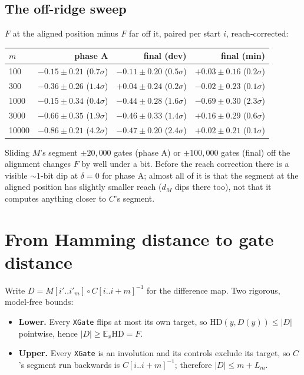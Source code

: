 \documentclass[11pt]{article}
\newcommand{\code}[1]{\texttt{#1}}
\newcommand{\HD}{\mathrm{HD}}
\newcommand{\Ex}{\mathbb{E}_x}
\begin{document}
\subsection{The off-ridge sweep}
$F$ at the aligned position minus $F$ far off it, paired per start $i$, reach-corrected:
\begin{center}\small
\begin{tabular}{@{}lrrr@{}}
\toprule
$m$ & phase A & final (dev) & final (min) \\
\midrule
100    & $-0.15\pm0.21$ ($0.7\sigma$) & $-0.11\pm0.20$ ($0.5\sigma$) & $+0.03\pm0.16$ ($0.2\sigma$) \\
300    & $-0.36\pm0.26$ ($1.4\sigma$) & $+0.04\pm0.24$ ($0.2\sigma$) & $-0.02\pm0.23$ ($0.1\sigma$) \\
1000   & $-0.15\pm0.34$ ($0.4\sigma$) & $-0.44\pm0.28$ ($1.6\sigma$) & $-0.69\pm0.30$ ($2.3\sigma$) \\
3000   & $-0.66\pm0.35$ ($1.9\sigma$) & $-0.46\pm0.33$ ($1.4\sigma$) & $+0.16\pm0.29$ ($0.6\sigma$) \\
10000  & $-0.86\pm0.21$ ($4.2\sigma$) & $-0.47\pm0.20$ ($2.4\sigma$) & $+0.02\pm0.21$ ($0.1\sigma$) \\
\bottomrule
\end{tabular}
\end{center}
Sliding $M$'s segment $\pm20{,}000$ gates (phase A) or $\pm100{,}000$ gates (final) off the alignment
changes $F$ by well under a bit. Before the reach correction there is a visible ${\sim}1$-bit dip at
$\delta=0$ for phase A; almost all of it is that the segment at the aligned position has slightly
smaller reach ($d_M$ dips there too), not that it computes anything closer to $C$'s segment.

\section{From Hamming distance to gate distance}

Write $D = M[i'..i'_m]\circ C[i..i{+}m]^{-1}$ for the difference map. Two rigorous, model-free bounds:

\begin{itemize}
\item \textbf{Lower.} Every \code{XGate} flips at most its own target, so $\HD(y,D(y))\le|D|$ pointwise,
hence $|D| \ge \Ex \HD = F$.
\item \textbf{Upper.} Every \code{XGate} is an involution and its controls exclude its target, so $C$'s
segment run backwards is $C[i..i{+}m]^{-1}$; therefore $|D| \le m + L_m$.
\end{itemize}
\end{document}
